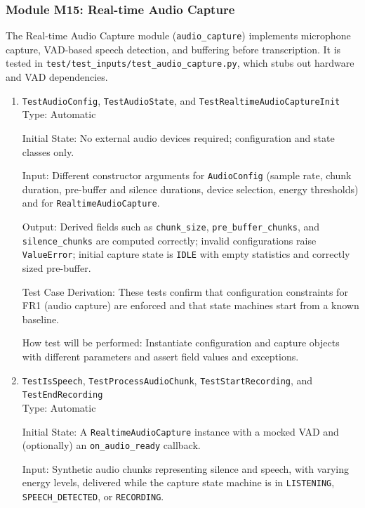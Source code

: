 \documentclass[12pt, titlepage]{article}
\begin{document}
\subsubsection{Module M15: Real-time Audio Capture}

The Real-time Audio Capture module (\texttt{audio\_capture}) implements microphone capture, VAD-based speech detection, and buffering before transcription. It is tested in \texttt{test/test\_inputs/test\_audio\_capture.py}, which stubs out hardware and VAD dependencies.

\begin{enumerate}
\item{\texttt{TestAudioConfig}, \texttt{TestAudioState}, and \texttt{TestRealtimeAudioCaptureInit}\\}
Type:  Automatic

Initial State: No external audio devices required; configuration and state classes only.

Input: Different constructor arguments for \texttt{AudioConfig} (sample rate, chunk duration, pre-buffer and silence durations, device selection, energy thresholds) and for \texttt{RealtimeAudioCapture}.

Output: Derived fields such as \texttt{chunk\_size}, \texttt{pre\_buffer\_chunks}, and \texttt{silence\_chunks} are computed correctly; invalid configurations raise \texttt{ValueError}; initial capture state is \texttt{IDLE} with empty statistics and correctly sized pre-buffer.

Test Case Derivation: These tests confirm that configuration constraints for FR1 (audio capture) are enforced and that state machines start from a known baseline.

How test will be performed: Instantiate configuration and capture objects with different parameters and assert field values and exceptions.

\item{\texttt{TestIsSpeech}, \texttt{TestProcessAudioChunk}, \texttt{TestStartRecording}, and \texttt{TestEndRecording}\\}
Type:  Automatic

Initial State: A \texttt{RealtimeAudioCapture} instance with a mocked VAD and (optionally) an \texttt{on\_audio\_ready} callback.

Input: Synthetic audio chunks representing silence and speech, with varying energy levels, delivered while the capture state machine is in \texttt{LISTENING}, \texttt{SPEECH\_DETECTED}, or \texttt{RECORDING}.


\end{enumerate}
\end{document}
